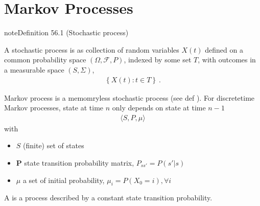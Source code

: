 \documentclass[letterpaper,10pt,english]{jupyterBook}
\begin{document}
\chapter{Markov Processes}
\label{\detokenize{ch/rl/mdp:markov-processes}}\label{\detokenize{ch/rl/mdp:rl-mdp}}\label{\detokenize{ch/rl/mdp::doc}}\label{ch/rl/mdp:def:stoch-process}
\begin{sphinxadmonition}{note}{Definition 56.1 (Stochastic process)}



\sphinxAtStartPar
A stochastic process is as collection of random variables \(X(t)\) defined on a common probability space \((\Omega, \mathcal{F}, P)\), indexed by some set \(T\), with outcomes in a measurable space \((S, \Sigma)\),
\begin{equation*}
\begin{split}\left\{ X(t): t \in T \right\} \ .\end{split}
\end{equation*}\end{sphinxadmonition}

\sphinxAtStartPar
Markov process is a memomry\sphinxhyphen{}less stochastic process (see def {\hyperref[\detokenize{ch/rl/mdp:def:stoch-process}]{}}). For discrete\sphinxhyphen{}time Markov processes, state at time \(n\) only depends on state at time \(n-1\)
\begin{equation*}
\begin{split}\langle S, P, \mu \rangle\end{split}
\end{equation*}
\sphinxAtStartPar
with
\begin{itemize}
\item {} 
\sphinxAtStartPar
\(S\) (finite) set of states

\item {} 
\sphinxAtStartPar
\(\mathbf{P}\) state transition probability matrix, \(P_{ss'} = P(s'|s)\)

\item {} 
\sphinxAtStartPar
\(\mu\) a set of initial probability, \(\mu_i = P(X_0 = i), \forall i\)

\end{itemize}

\sphinxAtStartPar
{}

\sphinxAtStartPar
A  is a process described by a constant state transition probability.
\end{document}
